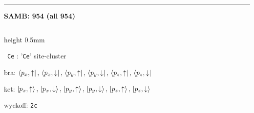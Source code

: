 \documentclass[fleqn,10pt,landscape]{jsarticle}
\begin{document}
\vspace{5mm}
\noindent \rule[0.5mm]{5mm}{0.5mm}\hspace{3mm}\textbf{SAMB: 954 (all 954)}\hspace{3mm}\leaders\hrule height 0.5mm\hfill\kern0pt
\vspace{3mm}

\vspace{5mm}

\noindent\textbullet\, \texttt{Ce} : '\texttt{Ce}' site-cluster

\noindent\quad * bra: $\bra{p_{x},\uparrow},\, \bra{p_{x},\downarrow},\, \bra{p_{y},\uparrow},\, \bra{p_{y},\downarrow},\, \bra{p_{z},\uparrow},\, \bra{p_{z},\downarrow}$

\noindent\quad * ket: $\ket{p_{x},\uparrow},\, \ket{p_{x},\downarrow},\, \ket{p_{y},\uparrow},\, \ket{p_{y},\downarrow},\, \ket{p_{z},\uparrow},\, \ket{p_{z},\downarrow}$

\noindent\quad * wyckoff: \texttt{2c}
\end{document}
